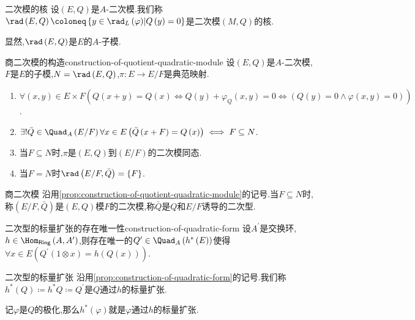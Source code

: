 \begin{definition}{二次模的核}{}
	设$\left(E,Q\right)$是$A$-二次模.我们称$\rad\left(E,Q\right)\coloneq\left\{y\in\rad_{L}\left(\varphi\right)\middle|Q\left(y\right)=0\right\}$是二次模$\left(M,Q\right)$的核.
\end{definition}

\begin{remark}{}{}
	显然,$\rad\left(E,Q\right)$是$E$的$A$-子模.
\end{remark}

\begin{proposition}{商二次模的构造}{construction-of-quotient-quadratic-module}
	设$\left(E,Q\right)$是$A$-二次模,$F$是$E$的子模,$N=\rad\left(E,Q\right)$,$\pi:E\to E/F$是典范映射.
	\begin{enumerate}
		\item $\forall\left(x,y\right)\in E\times F\left(Q\left(x+y\right)=Q\left(x\right)\iff Q\left(y\right)+\varphi_{Q}\left(x,y\right)=0\iff\left(Q\left(y\right)=0\wedge\varphi\left(x,y\right)=0\right)\right)$.
		\item $\exists!\bar{Q}\in\Quad_{A}\left(E/F\right)\forall x\in E\left(\bar{Q}\left(x+F\right)=Q\left(x\right)\right) \iff F\subseteq N$.
		\item 当$F\subseteq N$时,$\pi$是$\left(E,Q\right)$到$\left(E/F\right)$的二次模同态.
		\item 当$F=N$时$\rad\left(E/F,\bar{Q}\right)=\left\{F\right\}$.
	\end{enumerate}
\end{proposition}

\begin{definition}{商二次模}{}
	沿用\cref{prop:construction-of-quotient-quadratic-module}的记号.当$F\subseteq N$时,称$\left(E/F,\bar{Q}\right)$是$\left(E,Q\right)$模$F$的二次模,称$\bar{Q}$是$Q$和$E/F$诱导的二次型.
\end{definition}

\begin{proposition}{二次型的标量扩张的存在唯一性}{construction-of-quadratic-form}
	设$A^{\prime}$是交换环,$h\in\Hom_{\mathsf{Ring}}\left(A,A^{\prime}\right)$,则存在唯一的$Q^{\prime}\in\Quad_{A}\left(h^{\ast}\left(E\right)\right)$使得$\forall x\in E\left(Q^{\prime}\left(1\otimes x\right)=h\left(Q\left(x\right)\right)\right)$.
\end{proposition}

\begin{definition}{二次型的标量扩张}{}
	沿用\cref{prop:construction-of-quadratic-form}的记号.我们称$h^{\ast}\left(Q\right)\coloneq h^{\ast}Q\coloneq Q^{\prime}$是$Q$通过$h$的标量扩张.
\end{definition}

\begin{remark}{}{}
	记$\varphi$是$Q$的极化,那么$h^{\ast}\left(\varphi\right)$就是$\varphi$通过$h$的标量扩张.
\end{remark}